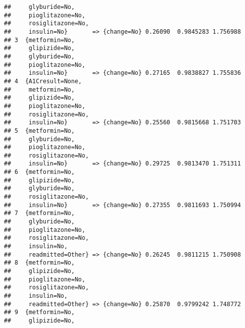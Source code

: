 \documentclass{article}\usepackage[]{graphicx}\usepackage[]{color}
\makeatletter
\newenvironment{kframe}{%
 \def\at@end@of@kframe{}%
 \ifinner\ifhmode%
  \def\at@end@of@kframe{\end{minipage}}%
  \begin{minipage}{\columnwidth}%
 \fi\fi%
 \def\FrameCommand##1{\hskip\@totalleftmargin \hskip-\fboxsep
 \colorbox{shadecolor}{##1}\hskip-\fboxsep
     \hskip-\linewidth \hskip-\@totalleftmargin \hskip\columnwidth}%
 \MakeFramed {\advance\hsize-\width
   \@totalleftmargin\z@ \linewidth\hsize
   \@setminipage}}%
 {\par\unskip\endMakeFramed%
 \at@end@of@kframe}
\newenvironment{knitrout}{}{} %
\makeatother
\begin{document}
\begin{knitrout}
\begin{kframe}
\begin{verbatim}
##     glyburide=No,                                               
##     pioglitazone=No,                                            
##     rosiglitazone=No,                                           
##     insulin=No}       => {change=No} 0.26090  0.9845283 1.756988
## 3  {metformin=No,                                               
##     glipizide=No,                                               
##     glyburide=No,                                               
##     pioglitazone=No,                                            
##     insulin=No}       => {change=No} 0.27165  0.9838827 1.755836
## 4  {A1Cresult=None,                                             
##     metformin=No,                                               
##     glipizide=No,                                               
##     pioglitazone=No,                                            
##     rosiglitazone=No,                                           
##     insulin=No}       => {change=No} 0.25560  0.9815668 1.751703
## 5  {metformin=No,                                               
##     glyburide=No,                                               
##     pioglitazone=No,                                            
##     rosiglitazone=No,                                           
##     insulin=No}       => {change=No} 0.29725  0.9813470 1.751311
## 6  {metformin=No,                                               
##     glipizide=No,                                               
##     glyburide=No,                                               
##     rosiglitazone=No,                                           
##     insulin=No}       => {change=No} 0.27355  0.9811693 1.750994
## 7  {metformin=No,                                               
##     glyburide=No,                                               
##     pioglitazone=No,                                            
##     rosiglitazone=No,                                           
##     insulin=No,                                                 
##     readmitted=Other} => {change=No} 0.26245  0.9811215 1.750908
## 8  {metformin=No,                                               
##     glipizide=No,                                               
##     pioglitazone=No,                                            
##     rosiglitazone=No,                                           
##     insulin=No,                                                 
##     readmitted=Other} => {change=No} 0.25870  0.9799242 1.748772
## 9  {metformin=No,                                               
##     glipizide=No,                                               

\end{verbatim}
\end{kframe}
\end{knitrout}
\end{document}
